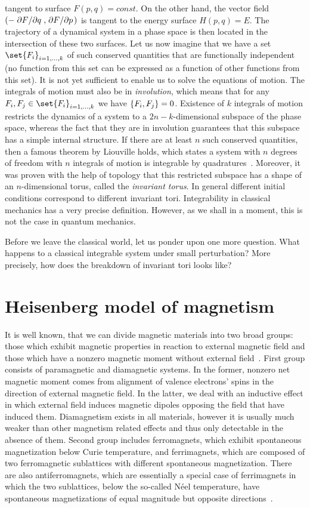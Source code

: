 tangent to surface \(F(p,q) = const\). On the other hand, the vector field 
\(\left(-\pdv*{F}{q},\pdv*{F}{p}\right)\) is tangent to the energy surface \(H(p,q) = E\).
The trajectory of a dynamical system in a phase space is then located in the intersection
of these two surfaces.
Let us now imagine that we have a set \(\set{F_i}_{i=1,\ldots,k}\) of such conserved
quantities that are functionally independent (no function from this set can be expressed
as a function of other functions from this set). It is not yet sufficient to enable us to solve
the equations of motion. The integrals of motion must also be in \textit{involution},
which means that for any \(F_i,F_j\in\set{F_i}_{i=1,\ldots,k}\) we have
\(\poissonbracket{F_i}{F_j} = 0\). Existence of \(k\) integrals of motion restricts
the dynamics of a system to a \(2n-k\)-dimensional subspace of the phase space, whereas the fact
that they are in involution guarantees that this subspace has a simple internal structure.
If there are at least \(n\) such conserved quantities, then a famous theorem by
Liouville holds, which states a system with \(n\) degrees of freedom with
\(n\) integrals of motion is integrable by quadratures~\autocite{arnold2013mathematical}.
Moreover, it was proven with the help of topology that this restricted subspace
has a shape of an \(n\)-dimensional torus, called the \textit{invariant torus}. In
general different initial conditions correspond to different invariant tori.
Integrability in classical mechanics has a very precise definition. However,
as we shall in a moment, this is not the case in quantum mechanics.

Before we leave the classical world, let us ponder upon one more question.
What happens to a classical integrable system under small perturbation? More precisely,
how does the breakdown of invariant tori looks like?

\section{Heisenberg model of magnetism\label{sec:XXZ}}
    It is well known, that we can divide magnetic materials into two broad groups: those which
exhibit magnetic properties in reaction to external magnetic field and those which have a nonzero
magnetic moment without external field~\autocite{spalek2015}. First group consists of paramagnetic
and diamagnetic systems. In the former, nonzero net magnetic moment comes from alignment of
valence electrons' spins in the direction of external magnetic field. In the latter, we deal with
 an inductive effect in which external field induces magnetic dipoles opposing the field that have
induced them. Diamagnetism exists in all materials, however it is usually much weaker than other magnetism related
effects and thus only detectable in the absence of them. Second group includes ferromagnets, which
exhibit spontaneous magnetization below Curie temperature, and ferrimagnets, which are 
composed of two ferromagnetic sublattices with different spontaneous magnetization. There
are also antiferromagnets, which are essentially a special case of ferrimagnets in which the two sublattices,
below the so-called N{\'e}el temperature, have spontaneous magnetizations of equal magnitude
but opposite directions~\autocite{nolting2018theoretical}.

